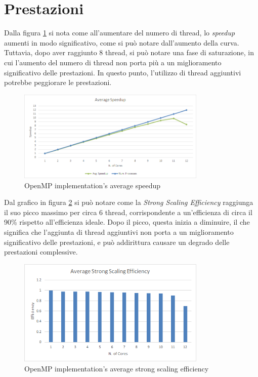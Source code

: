 \documentclass[a4paper, 12pt]{report}
\begin{document}
\section*{Prestazioni}
\begin{sloppypar}
  \noindent
  Dalla figura \ref{fig:omp_speedup} si nota come all'aumentare del numero di thread, lo \textit{speedup} aumenti in modo significativo,
  come si può notare dall'aumento della curva. Tuttavia, dopo aver raggiunto 8 thread, si può notare una fase di 
  saturazione, in cui l'aumento del numero di thread non porta più 
  a un miglioramento significativo delle prestazioni. In questo punto, l'utilizzo di thread aggiuntivi potrebbe 
  peggiorare le prestazioni. 

  \begin{figure}[ht]
    \centering
    \includegraphics[width=9cm]{img/omp-speedup.png}
    \caption{OpenMP implementation's average speedup}
    \label{fig:omp_speedup}
  \end{figure}

  \noindent
  Dal grafico in figura \ref{fig:omp_sse} si può notare come la \textit{Strong Scaling Efficiency} raggiunga
  il suo picco massimo per circa 6 thread, corrispondente a un'efficienza di circa il 90\% rispetto 
  all'efficienza ideale. Dopo il picco, questa inizia a diminuire, il che significa 
  che l'aggiunta di thread aggiuntivi non porta a un miglioramento significativo delle prestazioni, 
  e può addirittura causare un degrado delle prestazioni complessive.

  \begin{figure}[ht]
    \centering
    \includegraphics[width=9cm]{img/omp-sse.png}
    \caption{OpenMP implementation's average strong scaling efficiency}
    \label{fig:omp_sse}
  \end{figure}


\end{sloppypar}
\end{document}
